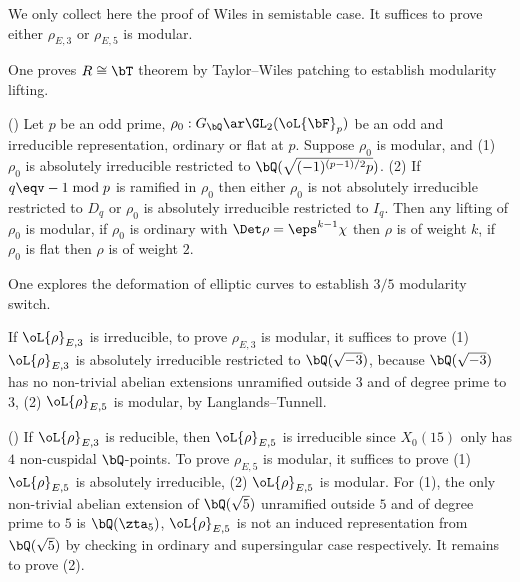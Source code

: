 \documentclass[a4paper, twoside]{article}
\begin{document}
\begin{prf}
	We only collect here the proof of Wiles\cite[Theorem~5.2]{Wiles1995} in semistable case. It suffices to prove either $\rho_{E,3}$ or $\rho_{E,5}$ is modular.

	 One proves $R\cong\bT$ theorem by Taylor--Wiles patching to establish modularity lifting.

	(\cite[Theorem~0.2]{Wiles1995}) Let $p$ be an odd prime, $\rho_{0}:G_{\bQ}\ar\GL_{2}(\oL{\bF}_{p})$ be an odd and irreducible representation, ordinary or flat at $p$. Suppose $\rho_{0}$ is modular, and (1) $\rho_{0}$ is absolutely irreducible restricted to $\bQ(\sqrt{(-1)^{(p-1)/2}p})$. (2) If $q\eqv-1\bmod{p}$ is ramified in $\rho_{0}$ then either $\rho_{0}$ is not absolutely irreducible restricted to $D_{q}$ or $\rho_{0}$ is absolutely irreducible restricted to $I_{q}$. Then any lifting of $\rho_{0}$ is modular, if $\rho_{0}$ is ordinary with $\Det\rho=\eps^{k-1}\chi$ then $\rho$ is of weight $k$, if $\rho_{0}$ is flat then $\rho$ is of weight $2$.


	 One explores the deformation of elliptic curves to establish $3/5$ modularity switch.

	If $\oL{\rho}_{E,3}$ is irreducible, to prove $\rho_{E,3}$ is modular, it suffices to prove (1) $\oL{\rho}_{E,3}$ is absolutely irreducible restricted to $\bQ(\sqrt{-3})$, because $\bQ(\sqrt{-3})$ has no non-trivial abelian extensions unramified outside $3$ and of degree prime to $3$, (2) $\oL{\rho}_{E,5}$ is modular, by Langlands--Tunnell.

	(\cite[Theorem~5.2]{Wiles1995}) If $\oL{\rho}_{E,3}$ is reducible, then $\oL{\rho}_{E,5}$ is irreducible since $X_{0}(15)$ only has $4$ non-cuspidal $\bQ$-points. To prove $\rho_{E,5}$ is modular, it suffices to prove (1) $\oL{\rho}_{E,5}$ is absolutely irreducible, (2) $\oL{\rho}_{E,5}$ is modular. For (1), the only non-trivial abelian extension of $\bQ(\sqrt{5})$ unramified outside $5$ and of degree prime to $5$ is $\bQ(\zta_{5})$, $\oL{\rho}_{E,5}$ is not an induced representation from $\bQ(\sqrt{5})$ by checking in ordinary and supersingular case respectively. It remains to prove (2).


\end{prf}
\end{document}

